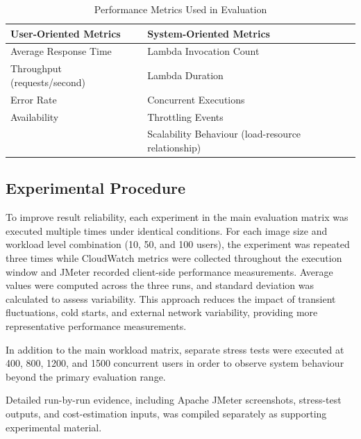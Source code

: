 \documentclass[11pt,a4paper,twocolumn]{article}
\begin{document}
\begin{table}[t]
\centering

\begin{tabularx}{\textwidth}{X X}
\toprule
User-Oriented Metrics & System-Oriented Metrics \\
\midrule
Average Response Time & Lambda Invocation Count \\
Throughput (requests/second) & Lambda Duration \\
Error Rate & Concurrent Executions \\
Availability & Throttling Events \\
 & Scalability Behaviour (load-resource relationship) \\
\bottomrule
\end{tabularx}

\caption{Performance Metrics Used in Evaluation}
\label{tab:metrics}
\end{table}


\subsection{Experimental Procedure}

To improve result reliability, each experiment in the main evaluation matrix was executed multiple times under identical conditions. For each image size and workload level combination (10, 50, and 100 users), the experiment was repeated three times while CloudWatch metrics were collected throughout the execution window and JMeter recorded client-side performance measurements. Average values were computed across the three runs, and standard deviation was calculated to assess variability. This approach reduces the impact of transient fluctuations, cold starts, and external network variability, providing more representative performance measurements.

In addition to the main workload matrix, separate stress tests were executed at 400, 800, 1200, and 1500 concurrent users in order to observe system behaviour beyond the primary evaluation range.

Detailed run-by-run evidence, including Apache JMeter screenshots, stress-test outputs, and cost-estimation inputs, was compiled separately as supporting experimental material.
\end{document}
